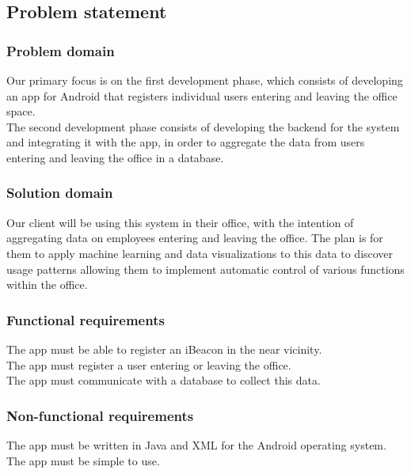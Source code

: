 \documentclass[12pt]{article}
\begin{document}
\newpage
\subsection{Problem statement}

\subsubsection{Problem domain}
Our primary focus is on the first development phase, which consists of developing an app for Android that registers individual users entering and leaving the office space.\\

The second development phase consists of developing the backend for the system and integrating it with the app, in order to aggregate the data from users entering and leaving the office in a database.\\



\subsubsection{Solution domain}
Our client will be using this system in their office, with the intention of aggregating data on employees entering and leaving the office. The plan is for them to apply machine learning and data visualizations to this data to discover usage patterns allowing them to implement automatic control of various functions within the office.



\subsubsection{Functional requirements}
The app must be able to register an iBeacon in the near vicinity.\\
The app must register a user entering or leaving the office.\\
The app must communicate with a database to collect this data.\\



\subsubsection{Non-functional requirements}
The app must be written in Java and XML for the Android operating system.\\
The app must be simple to use.\\
\end{document}
